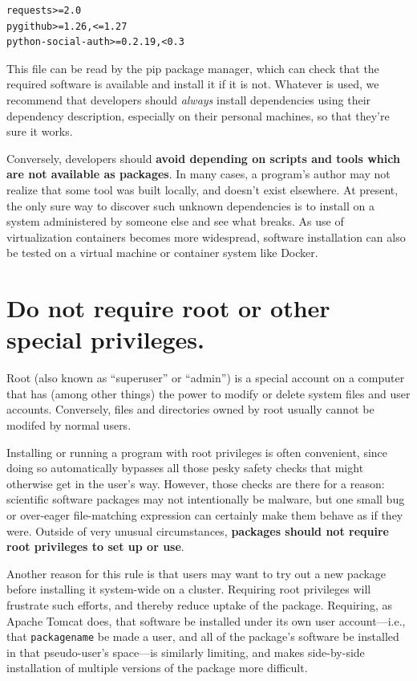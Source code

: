 \documentclass[10pt,letterpaper]{article}
\begin{document}
\begin{verbatim}
requests>=2.0
pygithub>=1.26,<=1.27
python-social-auth>=0.2.19,<0.3
\end{verbatim}

This file can be read by the pip package manager, which can check that the
required software is available and install it if it is not. 
Whatever is used,
we recommend that developers should \emph{always} install dependencies
using their dependency description, especially on their personal machines, so that
they're sure it works.

Conversely, developers should
\textbf{avoid depending on scripts and tools which are not available as packages}.
In many cases, a program's author may not realize that some tool was built locally, and
doesn't exist elsewhere. At present, the only sure way to discover such
unknown dependencies is to install on a system administered by someone
else and see what breaks. As use of virtualization containers becomes more
widespread, software installation can also be tested on a virtual machine or
container system like Docker.

\section{Do not require root or other special privileges.}

Root (also known as ``superuser'' or ``admin'') is a special account on
a computer that has (among other things) the power to modify or delete
system files and user accounts. Conversely, files and directories owned
by root usually cannot be modifed by normal users.

Installing or running a program with root privileges is often
convenient, since doing so automatically bypasses all those pesky safety
checks that might otherwise get in the user's way. However, those checks
are there for a reason: scientific software packages may not
intentionally be malware, but one small bug or over-eager file-matching
expression can certainly make them behave as if they were. Outside of
very unusual circumstances,
\textbf{packages should not require root privileges to set up or use}.

Another reason for this rule is that users may want to try out a new
package before installing it system-wide on a cluster. Requiring root
privileges will frustrate such efforts, and thereby reduce uptake of the
package. Requiring, as Apache Tomcat does, that software be installed
under its own user account---i.e.,
that \texttt{packagename} be made a user, and all of the
package's software be installed in that pseudo-user's space---is similarly limiting,
and makes side-by-side installation of multiple versions of
the package more difficult.
\end{document}

